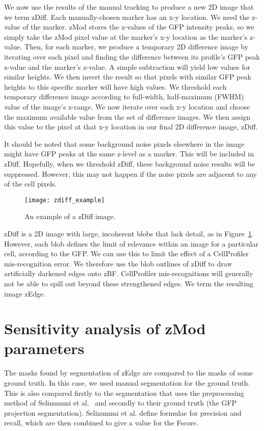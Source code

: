 We now use the results of the manual tracking to produce a new 2D image that we term zDiff. Each manually-chosen marker has an x-y location. We need the z-value of the marker. zMod stores the z-values of the GFP intensity peaks, so we simply take the zMod pixel value at the marker's x-y location as the marker's z-value. Then, for each marker, we produce a temporary 2D difference image by iterating over each pixel and finding the difference between its profile's GFP peak z-value and the marker's z-value. A simple subtraction will yield low values for similar heights. We then invert the result so that pixels with similar GFP peak heights to this specific marker will have high values. We threshold each temporary difference image according to full-width, half-maximum (FWHM) value of the image's z-range. We now iterate over each x-y location and choose the maximum available value from the set of difference images. We then assign this value to the pixel at that x-y location in our final 2D difference image, zDiff.

It should be noted that some background noise pixels elsewhere in the image might have GFP peaks at the same z-level as a marker. This will be included in zDiff. Hopefully, when we threshold zDiff, these background noise results will be suppressed. However, this may not happen if the noise pixels are adjacent to any of the cell pixels.

\begin{figure}[htbp!]
\centering
\texttt{[image: zdiff\_example]}
\caption[zDiff image sample]{An example of a zDiff image.}
\label{fig:zdiff}
\end{figure}

zDiff is a 2D image with large, incoherent blobs that lack detail, as in Figure~\ref{fig:zdiff}. However, each blob defines the limit of relevance within an image for a particular cell, according to the GFP. We can use this to limit the effect of a CellProfiler mis-recognition error. We therefore use the blob outlines of zDiff to draw artificially darkened edges onto zBF. CellProfiler mis-recognitions will generally not be able to spill out beyond these strengthened edges. We term the resulting image zEdge.

\section{Sensitivity analysis of zMod parameters}

The masks found by segmentation of zEdge are compared to the masks of some ground truth. In this case, we used manual segmentation for the ground truth. This is also compared firstly to the segmentation that uses the preprocessing method of Selinummi et al.~\cite{selinummi} and secondly to their ground truth (the GFP projection segmentation). Selinummi et al. define formulae for precision and recall, which are then combined to give a value for the Fscore.

